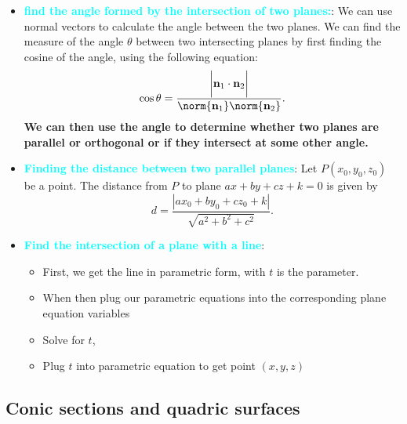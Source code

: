 \documentclass{report}
\begin{document}
\begin{itemize}
\begin{itemize}
        \end{itemize}
    \item \textbf{\textcolor{cyan}{find the angle formed by the intersection of two planes:}}: We can use normal vectors to calculate the angle between the two planes.
        \bigbreak \noindent 
        We can find the measure of the angle $\theta$ between two intersecting planes by first finding the cosine of the angle, using the following equation:
        \begin{align*}
            \cos{\theta }= \frac{\bigg\lvert \mathbf{n}_{1} \cdot \mathbf{n}_{2} \bigg\rvert}{\norm{\mathbf{n}_{1}}\norm{\mathbf{n}_{2}}}
        .\end{align*}
        \textbf{We can then use the angle to determine whether two planes are parallel or orthogonal or if they intersect at some other angle.}
        \pagebreak 
    \item \textbf{\textcolor{cyan}{Finding the distance between two parallel planes}}: 
        Let $P(x_0, y_0, z_0)$ be a point. The distance from $P$ to plane $ax + by + cz + k = 0$ is given by
        \[
            d = \frac{\left| ax_0 + by_0 + cz_0 + k \right|}{\sqrt{a^2 + b^2 + c^2}}.
        \]
    \item \textbf{\textcolor{cyan}{Find the intersection of a plane with a line}}:
        \begin{itemize}
            \item First, we get the line in parametric form, with $t$ is the parameter.
            \item When then plug our parametric equations into the corresponding plane equation variables
            \item Solve for $t$,
            \item Plug $t$ into parametric equation to get point $(x,y,z)$
        \end{itemize}

    \end{itemize}
    \pagebreak 
    \subsection{Conic sections and quadric surfaces}
    \bigbreak \noindent 
\end{document}
